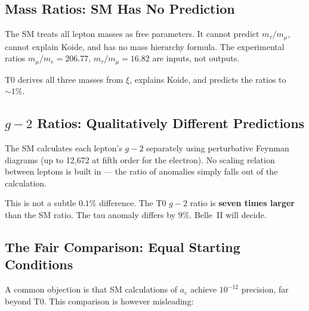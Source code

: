 \subsection{Mass Ratios: SM Has No Prediction}

The SM treats all lepton masses as free parameters. It cannot predict $m_\tau/m_\mu$, cannot explain Koide, and has no mass hierarchy formula. The experimental ratios $m_\mu/m_e = 206.77$, $m_\tau/m_\mu = 16.82$ are inputs, not outputs.

T0 derives all three masses from $\xi$, explains Koide, and predicts the ratios to $\sim 1\%$.

\subsection{$g-2$ Ratios: Qualitatively Different Predictions}

The SM calculates each lepton's $g-2$ separately using perturbative Feynman diagrams (up to 12,672 at fifth order for the electron). No scaling relation between leptons is built in --- the ratio of anomalies simply falls out of the calculation.

\begin{table}[h]
	\centering
	\caption{T0 vs SM: $g-2$ ratio predictions for the tau lepton}
	\label{tab:g2comparison}
\end{table}

This is not a subtle $0.1\%$ difference. The T0 $g-2$ ratio is \textbf{seven times larger} than the SM ratio. The tau anomaly differs by $9\%$. Belle~II will decide.

\subsection{The Fair Comparison: Equal Starting Conditions}

A common objection is that SM calculations of $a_e$ achieve $10^{-12}$ precision, far beyond T0. This comparison is however misleading:

